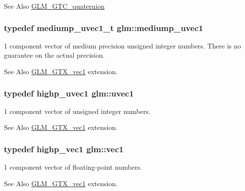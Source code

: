 \begin{DoxySeeAlso}{See Also}
\hyperlink{group__gtc__quaternion}{G\-L\-M\-\_\-\-G\-T\-C\-\_\-quaternion} 
\end{DoxySeeAlso}
\hypertarget{namespaceglm_a1fa5a5fb993ee72b4dc8d2a9caf85b26}{
\subsubsection[{mediump\-\_\-uvec1}]{\setlength{\rightskip}{0pt plus 5cm}typedef {\bf mediump\-\_\-uvec1\-\_\-t} {\bf glm\-::mediump\-\_\-uvec1}}}\label{namespaceglm_a1fa5a5fb993ee72b4dc8d2a9caf85b26}
1 component vector of medium precision unsigned integer numbers. There is no guarantee on the actual precision. \begin{DoxySeeAlso}{See Also}
\hyperlink{group__gtx__vec1}{G\-L\-M\-\_\-\-G\-T\-X\-\_\-vec1} extension. 
\end{DoxySeeAlso}
\hypertarget{namespaceglm_a4e12bc23a3d060164eef452f81d92a03}{
\subsubsection[{uvec1}]{\setlength{\rightskip}{0pt plus 5cm}typedef {\bf highp\-\_\-uvec1} {\bf glm\-::uvec1}}}\label{namespaceglm_a4e12bc23a3d060164eef452f81d92a03}
1 component vector of unsigned integer numbers. \begin{DoxySeeAlso}{See Also}
\hyperlink{group__gtx__vec1}{G\-L\-M\-\_\-\-G\-T\-X\-\_\-vec1} extension. 
\end{DoxySeeAlso}
\hypertarget{namespaceglm_a16030dae9029ed1eab1553a2183bbb79}{
\subsubsection[{vec1}]{\setlength{\rightskip}{0pt plus 5cm}typedef {\bf highp\-\_\-vec1} {\bf glm\-::vec1}}}\label{namespaceglm_a16030dae9029ed1eab1553a2183bbb79}
1 component vector of floating-\/point numbers. \begin{DoxySeeAlso}{See Also}
\hyperlink{group__gtx__vec1}{G\-L\-M\-\_\-\-G\-T\-X\-\_\-vec1} extension. 
\end{DoxySeeAlso}

